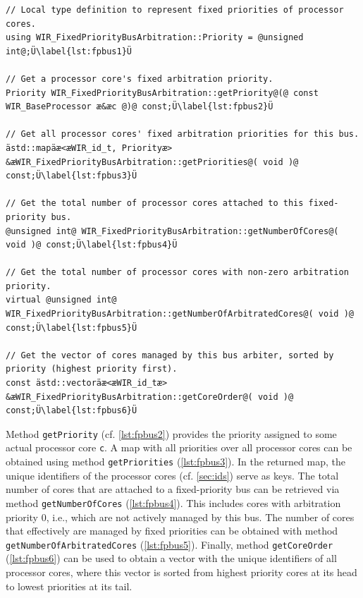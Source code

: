 \begin{lstlisting}[style=code,float=!b,caption={Characteristic Attributes of Class \texttt{WIR\_FixedPriorityBusArbitration}},label=lst:fpbus]
// Local type definition to represent fixed priorities of processor cores.
using WIR_FixedPriorityBusArbitration::Priority = @unsigned int@;Ü\label{lst:fpbus1}Ü

// Get a processor core's fixed arbitration priority.
Priority WIR_FixedPriorityBusArbitration::getPriority@(@ const WIR_BaseProcessor æ&æc @)@ const;Ü\label{lst:fpbus2}Ü

// Get all processor cores' fixed arbitration priorities for this bus.
ästd::mapäæ<æWIR_id_t, Priorityæ> &æWIR_FixedPriorityBusArbitration::getPriorities@( void )@ const;Ü\label{lst:fpbus3}Ü

// Get the total number of processor cores attached to this fixed-priority bus.
@unsigned int@ WIR_FixedPriorityBusArbitration::getNumberOfCores@( void )@ const;Ü\label{lst:fpbus4}Ü

// Get the total number of processor cores with non-zero arbitration priority.
virtual @unsigned int@ WIR_FixedPriorityBusArbitration::getNumberOfArbitratedCores@( void )@ const;Ü\label{lst:fpbus5}Ü

// Get the vector of cores managed by this bus arbiter, sorted by priority (highest priority first).
const ästd::vectoräæ<æWIR_id_tæ> &æWIR_FixedPriorityBusArbitration::getCoreOrder@( void )@ const;Ü\label{lst:fpbus6}Ü
\end{lstlisting}

Method \texttt{getPriority} (cf. \cref{lst:fpbus2}) provides the priority assigned to some actual processor core \texttt{c}.
A map with all priorities over all processor cores can be obtained using method \texttt{getPriorities} (\cref{lst:fpbus3}).
In the returned map, the unique identifiers of the processor cores (cf. \cref{sec:ids}) serve as keys.
The total number of cores that are attached to a fixed-priority bus can be retrieved via method \texttt{getNumberOfCores} (\cref{lst:fpbus4}).
This includes cores with arbitration priority 0, i.e., which are not actively managed by this bus.
The number of cores that effectively are managed by fixed priorities can be obtained with method \texttt{getNumberOfArbitratedCores} (\cref{lst:fpbus5}).
Finally, method \texttt{getCoreOrder} (\cref{lst:fpbus6}) can be used to obtain a vector with the unique identifiers of all processor cores, where this vector is sorted from highest priority cores at its head to lowest priorities at its tail.


